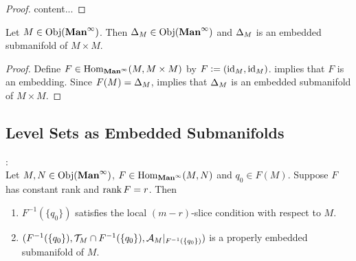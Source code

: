 \documentclass{book}
\begin{document}
	\begin{proof}
		content... 
	\end{proof}
	
	\begin{ex} 
		Let $M \in \operatorname{Obj}(\operatorname*{\text{\textbf{Man}}^{\infty}})$. Then $\Delta_M \in \operatorname{Obj}(\operatorname*{\text{\textbf{Man}}^{\infty}})$ and $\Delta_M$ is an embedded submanifold of $M \times M$.
	\end{ex}

	\begin{proof}
		Define $F \in \operatorname{Hom}_{\operatorname*{\text{\textbf{Man}}^{\infty}}}(M, M \times M)$ by $F \vcentcolon= (\operatorname{id}_M, \operatorname{id}_M)$.  implies that $F$ is an embedding. Since $F(M) = \Delta_M$,  implies that $\Delta_M$ is an embedded submanifold of $M \times M$.
	\end{proof}
	




	
	
	
	
	
	
	
	
	
	
	
	
	
	
	
	
	
	
	
	
	
	
	
	
	
	
	
	
	
	
	
	
	
	
	
	
	

	\subsection{Level Sets as Embedded Submanifolds}

	\begin{ex}  : \\
		Let $M, N \in \operatorname{Obj}(\operatorname*{\text{\textbf{Man}}^{\infty}})$, $F \in \operatorname{Hom}_{\operatorname*{\text{\textbf{Man}}^{\infty}}}(M,N)$ and $q_0 \in F(M)$. Suppose $F$ has constant rank and $\operatorname{\text{rank}} F = r$. Then 
		\begin{enumerate}
			\item $F^{-1}(\{q_0\})$ satisfies the local $(m-r)$-slice condition with respect to $M$. 
			\item $(F^{-1}(\{q_0\}), \mathcal{T}_M \cap F^{-1}(\{q_0\}), \mathcal{A}_M|_{F^{-1}(\{q_0\})})$ is a properly embedded submanifold of $M$.
		\end{enumerate}
	\end{ex}
\end{document}
